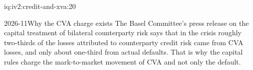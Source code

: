 \begin{solution}{iq:iv2:credit-and-xva:20}
\begin{dated}{2026-11}{Why the CVA charge exists}\label{dat:iv2:credit-and-xva:cva}
The Basel Committee's press release on the capital treatment of bilateral counterparty risk says that in the crisis roughly two-thirds of the losses attributed to counterparty credit risk came from CVA losses, and only about one-third from actual defaults. That is why the capital rules charge the mark-to-market movement of CVA and not only the default.
\end{dated}

\end{solution}
